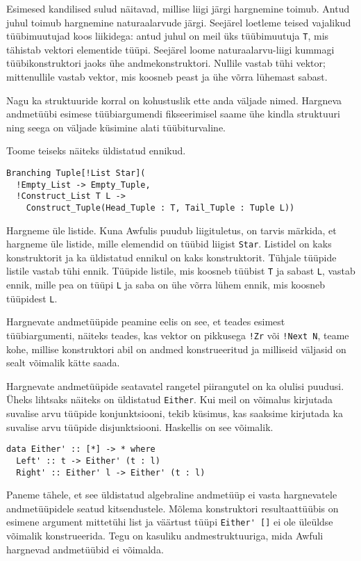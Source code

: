 \documentclass[12pt]{article}
\begin{document}
        Esimesed kandilised sulud näitavad, millise liigi järgi hargnemine toimub. Antud juhul toimub hargnemine naturaalarvude järgi. Seejärel loetleme teised vajalikud tüübimuutujad koos liikidega: antud juhul on meil üks tüübimuutuja \verb!T!, mis tähistab vektori elementide tüüpi. Seejärel loome naturaalarvu-liigi kummagi tüübikonstruktori jaoks ühe andmekonstruktori. Nullile vastab tühi vektor; mittenullile vastab vektor, mis koosneb peast ja ühe võrra lühemast sabast.

        Nagu ka struktuuride korral on kohustuslik ette anda väljade nimed. Hargneva andmetüübi esimese tüübiargumendi fikseerimisel saame ühe kindla struktuuri ning seega on väljade küsimine alati tüübiturvaline.

        Toome teiseks näiteks üldistatud ennikud.

        \begin{verbatim}Branching Tuple[!List Star](
  !Empty_List -> Empty_Tuple,
  !Construct_List T L ->
    Construct_Tuple(Head_Tuple : T, Tail_Tuple : Tuple L))\end{verbatim}

        Hargneme üle listide. Kuna Awfulis puudub liigituletus, on tarvis märkida, et hargneme üle listide, mille elemendid on tüübid liigist \verb!Star!. Listidel on kaks konstruktorit ja ka üldistatud ennikul on kaks konstruktorit. Tühjale tüüpide listile vastab tühi ennik. Tüüpide listile, mis koosneb tüübist \verb!T! ja sabast \verb!L!, vastab ennik, mille pea on tüüpi \verb!L! ja saba on ühe võrra lühem ennik, mis koosneb tüüpidest \verb!L!.

        Hargnevate andmetüüpide peamine eelis on see, et teades esimest tüübiargumenti, näiteks teades, kas vektor on pikkusega \verb"!Zr" või \verb"!Next N", teame kohe, millise konstruktori abil on andmed konstrueeritud ja milliseid väljasid on sealt võimalik kätte saada.

        Hargnevate andmetüüpide seatavatel rangetel piirangutel on ka olulisi puudusi. Üheks lihtsaks näiteks on üldistatud \verb!Either!. Kui meil on võimalus kirjutada suvalise arvu tüüpide konjunktsiooni, tekib küsimus, kas saaksime kirjutada ka suvalise arvu tüüpide disjunktsiooni. Haskellis on see võimalik.

        \begin{verbatim}data Either' :: [*] -> * where
  Left' :: t -> Either' (t : l)
  Right' :: Either' l -> Either' (t : l)\end{verbatim}

        Paneme tähele, et see üldistatud algebraline andmetüüp ei vasta hargnevatele andmetüüpidele seatud kitsendustele. Mõlema konstruktori resultaattüübis on esimene argument mittetühi list ja väärtust tüüpi \verb!Either' []! ei ole üleüldse võimalik konstrueerida. Tegu on kasuliku andmestruktuuriga, mida Awfuli hargnevad andmetüübid ei võimalda.
\end{document}
